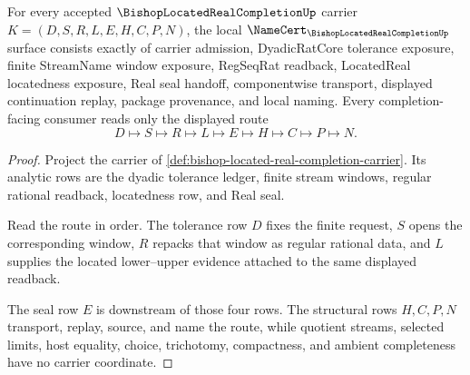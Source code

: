\begin{theorem}
\label{thm:bishop-located-real-completion-namecert-obligations}
For every accepted $\BishopLocatedRealCompletionUp$ carrier $K=(D,S,R,L,E,H,C,P,N)$, the local $\NameCert_{\BishopLocatedRealCompletionUp}$ surface consists exactly of carrier admission, DyadicRatCore tolerance exposure, finite StreamName window exposure, RegSeqRat readback, LocatedReal locatedness exposure, Real seal handoff, componentwise transport, displayed continuation replay, package provenance, and local naming. Every completion-facing consumer reads only the displayed route
$$
D\longmapsto S\longmapsto R\longmapsto L\longmapsto E\longmapsto H\longmapsto C\longmapsto P\longmapsto N.
$$
\end{theorem}
\begin{proof}
Project the carrier of \autoref{def:bishop-located-real-completion-carrier}. Its analytic rows are the dyadic tolerance ledger, finite stream windows, regular rational readback, locatedness row, and Real seal.

Read the route in order. The tolerance row $D$ fixes the finite request, $S$ opens the corresponding window, $R$ repacks that window as regular rational data, and $L$ supplies the located lower--upper evidence attached to the same displayed readback.

The seal row $E$ is downstream of those four rows. The structural rows $H,C,P,N$ transport, replay, source, and name the route, while quotient streams, selected limits, host equality, choice, trichotomy, compactness, and ambient completeness have no carrier coordinate.
\end{proof}

